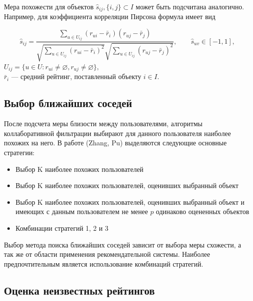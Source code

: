\documentclass[a4paper, 12pt]{article} %
\begin{document}
Мера похожести для объектов $\hat{s}_{ij}, \{i, j\} \subset I$ может быть подсчитана аналогично. Например, для коэффициента корреляции Пирсона формула имеет вид

\[
	\hat{s}_{ij} = \frac{\sum_{u \in U_{ij}} (r_{ui} - \bar{r}_{i})(r_{uj} - \bar{r}_{j})}{\sqrt{\sum_{u \in U_{ij}}  (r_{ui} - \bar{r}_{i})^2} \sqrt{\sum_{u \in U_{ij}}  (r_{uj} - \bar{r}_{j})^2}},\qquad \hat{s}_{uv} \in [-1, 1],
\]
\noindent
$U_{ij} = \{u \in U: r_{ui} \neq  \varnothing, r_{uj} \neq \varnothing\},$ 
\\
$\bar{r}_{i}$ --- средний рейтинг, поставленный объекту $i \in I$. 
\\ 


\subsection{Выбор ближайших соседей}
После подсчета меры близости между пользователями, алгоритмы коллаборативной фильтрации выбирают  для данного пользователя наиболее похожих на него. В работе (Zhang, Pu)\cite{neighbourhoodselection} выделяются следующие основные стратегии:
\begin{itemize}

\item Выбор K наиболее похожих пользователей

\item Выбор K наиболее похожих пользователей, оценивших выбранный объект

\item Выбор K наиболее похожих пользователей, оценивших выбранный объект и имеющих с данным пользователем не менее $p$ одинаково оцененных объектов

\item Комбинации стратегий 1, 2 и 3

\end{itemize}

Выбор метода поиска ближайших соседей зависит от выбора меры схожести, а так же от области применения рекомендательной системы. Наиболее предпочтительным является использование комбинаций стратегий.


\subsection{Оценка неизвестных рейтингов}
\end{document}
